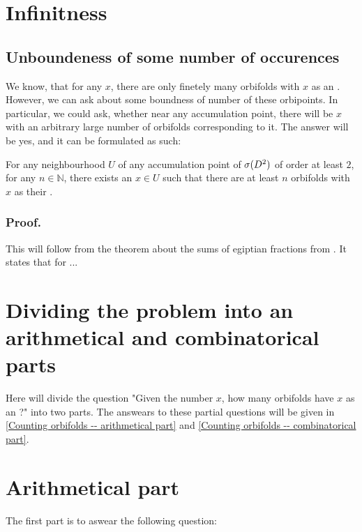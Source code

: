 \section{Infinitness}
\subsection{Unboundeness of some number of occurences}
We know, that for any $x$, there are only finetely many orbifolds with $x$ as an \Eoc . 
However, we can ask about some boundness of number of these orbipoints. 
In particular, we could ask, whether near any accumulation point, there will be $x$ with an 
arbitrary large number of orbifolds corresponding to it. 
The answer will be yes, and it can be formulated as such:
\begin{theorem}\label{unboundness}
For any neighbourhood $U$ of any accumulation point of ${{\sigma}(D^2)}$ of order at least $2$, for any 
$n\in \mathbb{N}$, 
there exists an $x\in U$ such that there are at least $n$ orbifolds with $x$ as their 
\Eoc.
\end{theorem}
\subsubsection{Proof.}
This will follow from the theorem about the sums of egiptian fractions from \cite{Browning2011}.
It states that for ...




\section{Dividing the problem into an arithmetical and combinatorical parts}
\label{dividing the problem}
Here will divide the question "Given the number $x$, how many orbifolds have $x$ as an \Eoc?" 
into two parts. The answears to these partial questions will be given in 
\ref{Counting orbifolds -- arithmetical part} and 
\ref{Counting orbifolds -- combinatorical part}.   
\section{Arithmetical part}\label{arithmetical part}
The first part is to aswear the following question:

